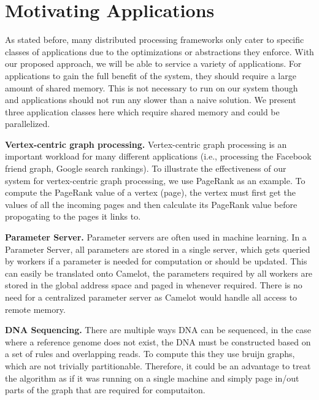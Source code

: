 \section{Motivating Applications} 

\label{sec:apps}
As stated before, many distributed processing frameworks only cater to specific
classes of applications due to the optimizations or abstractions they enforce.
With our proposed approach, we will be able to service a variety of
applications. For applications to gain the full benefit of the system, they
should require a large amount of shared memory. This is not necessary to run on
our system though and applications should not run any slower than a naive
solution. We present three application classes here which require shared memory
and could be parallelized. 

\textbf{Vertex-centric graph processing.} Vertex-centric graph processing is an
important workload for many different applications (i.e., processing the
Facebook friend graph, Google search rankings). To illustrate the effectiveness
of our system for vertex-centric graph processing, we use PageRank as an
example. To compute the PageRank value of a vertex (page), the vertex must first
get the values of all the incoming pages and then calculate its PageRank value
before propogating to the pages it links to. 

\textbf{Parameter Server.} Parameter servers are often used in machine learning.
 In a Parameter Server, all parameters are stored in a single
server, which gets queried by workers if a parameter is needed for computation
or should be updated. This can easily be translated onto Camelot, the parameters
required by all workers are stored in the global address space and paged in
whenever required. There is no need for a centralized parameter server as
Camelot would handle all access to remote memory. 

\textbf{DNA Sequencing.} There are multiple ways DNA can be sequenced, in the
case where a reference genome does not exist, the DNA must be constructed based
on a set of rules and overlapping reads. To compute this they use bruijn graphs,
which are not trivially partitionable. Therefore, it could be an advantage to
treat the algorithm as if it was running on a single machine and simply page
in/out parts of the graph that are required for computaiton. 